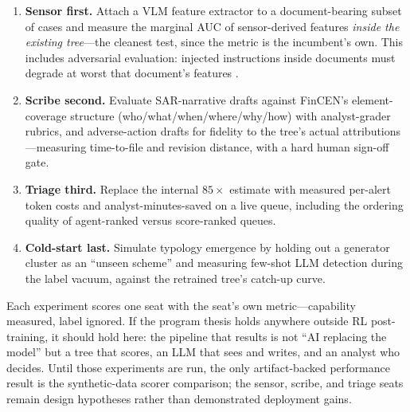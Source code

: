 \documentclass{article}
\begin{document}
\begin{enumerate}[leftmargin=1.5em, itemsep=1pt, topsep=2pt]
\item \textbf{Sensor first.} Attach a VLM feature extractor to a
document-bearing subset of cases and measure the marginal AUC of
sensor-derived features \emph{inside the existing tree}---the cleanest test,
since the metric is the incumbent's own. This includes adversarial
evaluation: injected instructions inside documents must degrade at worst that
document's features \citep{greshake2023injection}.
\item \textbf{Scribe second.} Evaluate SAR-narrative drafts against FinCEN's
element-coverage structure (who/what/when/where/why/how)
\citep{fincen2003sarnarrative} with analyst-grader rubrics, and
adverse-action drafts for fidelity to the tree's actual attributions
\citep{cfr1002_9, cfpb2022circular}---measuring time-to-file and revision
distance, with a hard human sign-off gate.
\item \textbf{Triage third.} Replace the internal $85\times$ estimate with
measured per-alert token costs and analyst-minutes-saved on a live queue,
including the ordering quality of agent-ranked versus score-ranked queues.
\item \textbf{Cold-start last.} Simulate typology emergence by holding out a
generator cluster as an ``unseen scheme'' and measuring few-shot LLM detection
during the label vacuum, against the retrained tree's catch-up curve.
\end{enumerate}

Each experiment scores one seat with the seat's own metric---capability
measured, label ignored. If the program thesis holds anywhere outside RL
post-training, it should hold here: the pipeline that results is not ``AI
replacing the model'' but a tree that scores, an LLM that sees and writes, and
an analyst who decides. Until those experiments are run, the only artifact-backed
performance result is the synthetic-data scorer comparison; the sensor, scribe,
and triage seats remain design hypotheses rather than demonstrated deployment
gains.
 

\end{document}
